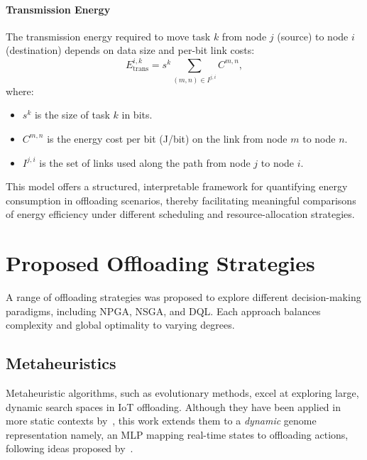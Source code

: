\documentclass[preprint,3p,authoryear]{elsarticle}
\begin{document}
\paragraph{Transmission Energy}
The transmission energy required to move task \(k\) from node \(j\) (source) to node \(i\) (destination) depends on data size and per-bit link costs:
\begin{equation}
E_{\text{trans}}^{i,k} = s^{k} \sum_{(m,n) \in I^{j,i}} C^{m,n},
\end{equation}
where:
\begin{itemize}
    \item \(s^{k}\) is the size of task \(k\) in bits.
    \item \(C^{m,n}\) is the energy cost per bit (J/bit) on the link from node \(m\) to node \(n\).
    \item \(I^{j,i}\) is the set of links used along the path from node \(j\) to node \(i\).
\end{itemize}

This model offers a structured, interpretable framework for quantifying energy consumption in offloading scenarios, thereby facilitating meaningful comparisons of energy efficiency under different scheduling and resource-allocation strategies.


\section{Proposed Offloading Strategies}\label{sec:offloading_strategies}


A range of offloading strategies was proposed to explore different decision-making paradigms, including NPGA, NSGA, and DQL. Each approach balances complexity and global optimality to varying degrees.

\subsection{Metaheuristics}\label{subsec:metaheuristics}

Metaheuristic algorithms, such as evolutionary methods, excel at exploring large, dynamic search spaces in IoT offloading. Although they have been applied in more static contexts by~\cite{bernard_d-npga_2024}, this work extends them to a \emph{dynamic} genome representation namely, an MLP mapping real-time states to offloading actions, following ideas proposed by~\cite{such2018deepneuroevolutiongeneticalgorithms}.

    
\end{document}
